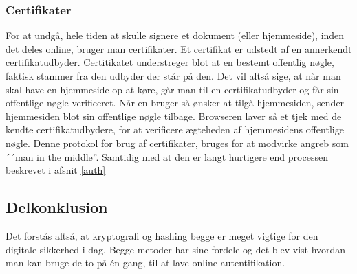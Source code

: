     \subsubsection{Certifikater}
    For at undgå, hele tiden at skulle signere et dokument (eller hjemmeside), inden det deles online, bruger man certifikater.\cite{cert}
    Et certifikat er udstedt af en annerkendt certifikatudbyder.
    Certitikatet understreger blot at en bestemt offentlig nøgle, faktisk stammer fra den udbyder der står på den.
    Det vil altså sige, at når man skal have en hjemmeside op at køre, går man til en certifikatudbyder og får sin offentlige nøgle verificeret.
    Når en bruger så ønsker at tilgå hjemmesiden, sender hjemmesiden blot sin offentlige nøgle tilbage.
    Browseren laver så et tjek med de kendte certifikatudbydere, for at verificere ægteheden af hjemmesidens offentlige nøgle.
    Denne protokol for brug af certifikater, bruges for at modvirke angreb som ´´man in the middle''.
    Samtidig med at den er langt hurtigere end processen beskrevet i afsnit \ref{auth}





\subsection{Delkonklusion}
Det forstås altså, at kryptografi og hashing begge er meget vigtige for den digitale sikkerhed i dag.
Begge metoder har sine fordele og det blev vist hvordan man kan bruge de to på én gang, til at lave online autentifikation.
